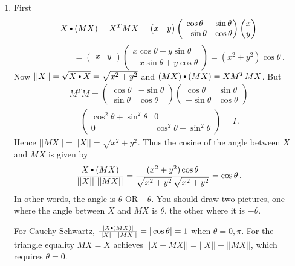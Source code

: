 \begin{enumerate}
\item First \[X\dotprod (MX)=X^T M X = \begin{pmatrix}x & y\end{pmatrix}
\begin{pmatrix}\cos\theta &\sin\theta \\ -\sin\theta & \cos\theta\end{pmatrix}
\begin{pmatrix}x \\ y\end{pmatrix}\]
\[
\hspace{2cm}
= \begin{pmatrix}x & y\end{pmatrix}\begin{pmatrix}x \cos\theta + y\sin\theta \\ -x\sin\theta + y\cos\theta\end{pmatrix}
=(x^2+y^2)\cos\theta\, .
\]
Now $||X||=\sqrt{X\dotprod X}=\sqrt{x^2 + y^2}$ and 
$
(MX)\dotprod (MX)= X M^T M X
$. But
\begin{gather*}
M^T M = \begin{pmatrix}\cos\theta &-\sin\theta \\ \sin\theta & \cos\theta\end{pmatrix}
\begin{pmatrix}\cos\theta &\sin\theta \\ -\sin\theta & \cos\theta\end{pmatrix}\\=
\begin{pmatrix}\cos^2\theta +\sin^2\theta& 0 \\ 0 & \cos^2\theta +\sin^2\theta\end{pmatrix}=I\, .
\end{gather*}
Hence $||MX||=||X||=\sqrt{x^2+y^2}$. Thus the cosine of the angle between $X$ and $MX$ is given by
\[
\frac{X\dotprod (MX)}{||X|| \ ||MX||}= \frac{(x^2+y^2)\cos\theta}{\sqrt{x^2+y^2}\, \sqrt{x^2+y^2}} = \cos \theta\, .
\]
In other words, the angle is $\theta$ OR $-\theta$. You should draw two pictures, one where the angle between
$X$ and $MX$ is $\theta$, the other where it is $-\theta$. 


For Cauchy-Schwartz, $\frac{|X\dotprod (MX)|}{||X|| \ ||MX||}=|\cos\theta|=1$ when $\theta=0,\pi$. 
For the triangle equality $MX = X$ achieves $||X+MX||=||X||+||MX||$, which requires $\theta=0$. 


\end{enumerate}
